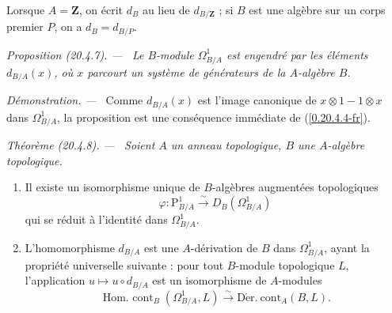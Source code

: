 \documentclass[10pt,oneside]{book}
\makeatletter
\newcommand{\sref}[1]{(\ref{#1})}
\newcommand{\setmanualcurrentlabel}[1]{\def\@currentlabel{#1}}
\newenvironment{proposition}[1][]{%
  \setmanualcurrentlabel{#1}\par\medskip\noindent\itshape Proposition (#1). ---\ }{\par}
\newenvironment{theorem}[1][]{%
  \setmanualcurrentlabel{#1}\par\medskip\noindent\itshape Théorème (#1). ---\ }{\par}
\newenvironment{proof}{%
  \par\medskip\noindent\textit{Démonstration. ---\ }}{\par}
\makeatother
\begin{document}
Lorsque $A=\mathbf{Z}$, on écrit $d_B$ au lieu de $d_{B/\mathbf{Z}}$ ; si $B$
est une algèbre sur un corps premier $P$, on a $d_B=d_{B/P}$.

\begin{proposition}[20.4.7]
\label{0.20.4.7-fr}
Le $B$-module $\Omega^1_{B/A}$ est engendré par les éléments $d_{B/A}(x)$,
où $x$ parcourt un système de générateurs de la $A$-algèbre $B$.
\end{proposition}

\begin{proof}
Comme $d_{B/A}(x)$ est l'image canonique de $x\otimes1-1\otimes x$ dans
$\Omega^1_{B/A}$, la proposition est une conséquence immédiate de
\sref{0.20.4.4-fr}.
\end{proof}

\begin{theorem}[20.4.8]
\label{0.20.4.8-fr}
Soient $A$ un anneau topologique, $B$ une $A$-algèbre topologique.
\begin{enumerate}
  \item[\rm(i)] Il existe un isomorphisme unique de $B$-algèbres augmentées
  topologiques
\begin{equation}
\tag{20.4.8.1}
\label{0.20.4.8.1-fr}
  \varphi:\mathrm{P}^1_{B/A}\xrightarrow{\sim}D_B(\Omega^1_{B/A})
\end{equation}
qui se réduit à l'identité dans $\Omega^1_{B/A}$.
  \item[\rm(ii)] L'homomorphisme $d_{B/A}$ est une $A$-dérivation de $B$
  dans $\Omega^1_{B/A}$, ayant la propriété universelle suivante : pour tout
  $B$-module topologique $L$, l'application $u\mapsto u\circ d_{B/A}$ est
  un isomorphisme de $A$-modules
\begin{equation}
\tag{20.4.8.2}
\label{0.20.4.8.2-fr}
  \operatorname{Hom.\ cont}_B(\Omega^1_{B/A},L)
  \xrightarrow{\sim}\operatorname{D\acute{e}r.\ cont}_A(B,L).
\end{equation}
\end{enumerate}
\end{theorem}
\end{document}
